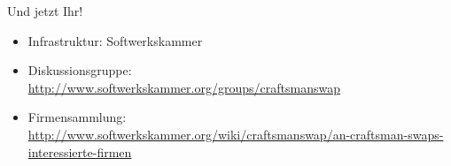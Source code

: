 \begin{frame}{Und jetzt Ihr!}

\begin{itemize}

\item Infrastruktur: Softwerkskammer

\item Diskussionsgruppe: \\ \url{http://www.softwerkskammer.org/groups/craftsmanswap}

\item Firmensammlung: \\ \url{http://www.softwerkskammer.org/wiki/craftsmanswap/an-craftsman-swaps-interessierte-firmen}

\end{itemize}

\end{frame}

